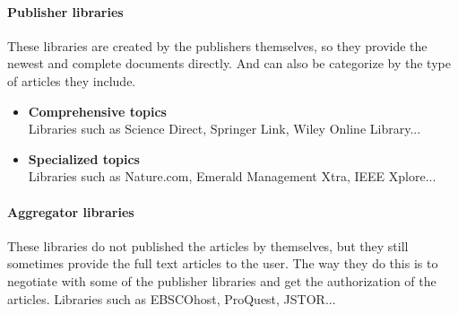 \paragraph{Publisher libraries}
	These libraries are created by the publishers themselves, so they provide the newest and complete documents directly. And can also be categorize by the type of articles they include.
	\begin{itemize}
		\item\textbf{Comprehensive topics}\\Libraries such as Science Direct, Springer Link, Wiley Online Library...
		\item\textbf{Specialized topics}\\Libraries such as Nature.com, Emerald Management Xtra, IEEE Xplore...
	\end{itemize}
\paragraph{Aggregator libraries}
	These libraries do not published the articles by themselves, but they still sometimes provide the full text articles to the user. The way they do this is to negotiate with some of the publisher libraries and get the authorization of the articles. Libraries such as EBSCOhost, ProQuest, JSTOR...

